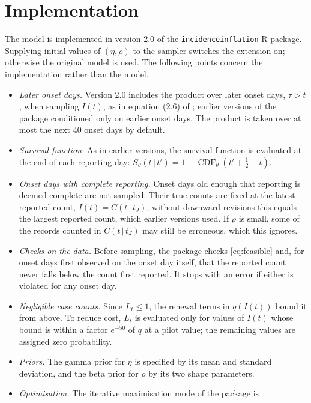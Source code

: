 \documentclass[11pt,a4paper]{article}
\newcommand{\given}{\,|\,}
\begin{document}
\section{Implementation}\label{sec:implementation}

The model is implemented in version 2.0 of the \texttt{incidenceinflation} R
package. Supplying initial values of $(\eta,\rho)$ to the sampler switches the
extension on; otherwise the original model is used. The following points
concern the implementation rather than the model.

\begin{itemize}[itemsep=2pt]
\item \emph{Later onset days.} Version 2.0 includes the product over later
onset days, $\tau>t$, when sampling $I(t)$, as in equation (2.6) of
\cite{bajaj2025}; earlier versions of the package conditioned only on earlier
onset days. The product is taken over at most the next 40 onset days by
default.
\item \emph{Survival function.} As in earlier versions, the survival function
is evaluated at the end of each reporting day:
$S_\theta(t\given t')=1-\operatorname{CDF}_\theta(t'+\tfrac12-t)$.
\item \emph{Onset days with complete reporting.} Onset days old enough that
reporting is deemed complete are not sampled. Their true counts are fixed at
the latest reported count, $I(t)=C(t\given t_J)$; without downward revisions
this equals the largest reported count, which earlier versions used. If $\rho$
is small, some of the records counted in $C(t\given t_J)$ may still be
erroneous, which this ignores.
\item \emph{Checks on the data.} Before sampling, the package checks
\eqref{eq:feasible} and, for onset days first observed on the onset day itself,
that the reported count never falls below the count first reported. It stops
with an error if either is violated for any onset day.
\item \emph{Negligible case counts.} Since $L_t\le 1$, the renewal terms in
$q(I(t))$ bound it from above. To reduce cost, $L_t$ is evaluated only for
values of $I(t)$ whose bound is within a factor $e^{-50}$ of $q$ at a pilot
value; the remaining values are assigned zero probability.
\item \emph{Priors.} The gamma prior for $\eta$ is specified by its mean and
standard deviation, and the beta prior for $\rho$ by its two shape parameters.
\item \emph{Optimisation.} The iterative maximisation mode of the package is

\end{itemize}
\end{document}
